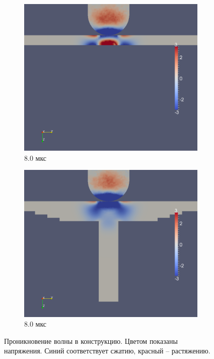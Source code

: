 \begin{figure}[H]
\begin{subfigure}[b]{0.5\textwidth}
\centering
\includegraphics[width=\textwidth]{png/pkm-experiment/wing-only/wave/syy-0007.png}
\caption{8.0 мкс}
\end{subfigure}
\begin{subfigure}[b]{0.5\textwidth}
\centering
\includegraphics[width=\textwidth]{png/pkm-experiment/wing-stringer/wave/syy-0007.png}
\caption{8.0 мкс}
\end{subfigure}
\caption{Проникновение волны в конструкцию. Цветом показаны напряжения. Синий соответствует сжатию, красный -- растяжению.}
\label{pic:pkm_experiment_stress_middle}
\end{figure}

